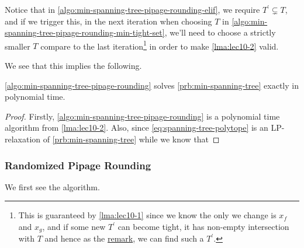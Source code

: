 \begin{note}
	Notice that in \autoref{algo:min-spanning-tree-pipage-rounding-elif}, we require \(T^\prime \subsetneq T\), and if we trigger this, in the next iteration when choosing \(T\) in \autoref{algo:min-spanning-tree-pipage-rounding-min-tight-set}, we'll need to choose a strictly smaller \(T\) compare to the last iteration\footnote{This is guaranteed by \autoref{lma:lec10-1} since we know the only we change is \(x_f\) and \(x_g\), and if some new \(T^\prime \) can become tight, it has non-empty intersection with \(T\) and hence as the \hyperref[rmk:lec10-1]{remark}, we can find such a \(T^\prime \).} in order to make \autoref{lma:lec10-2} valid.
\end{note}

We see that this implies the following.

\begin{theorem}
	\autoref{algo:min-spanning-tree-pipage-rounding} solves \autoref{prb:min-spanning-tree} exactly in polynomial time.
\end{theorem}
\begin{proof}
	Firstly, \autoref{algo:min-spanning-tree-pipage-rounding} is a polynomial time algorithm from \autoref{lma:lec10-2}. Also, since \autoref{eq:spanning-tree-polytope} is an LP-relaxation of \autoref{prb:min-spanning-tree} while we know that
\end{proof}

\subsubsection{Randomized Pipage Rounding}
We first see the algorithm.

